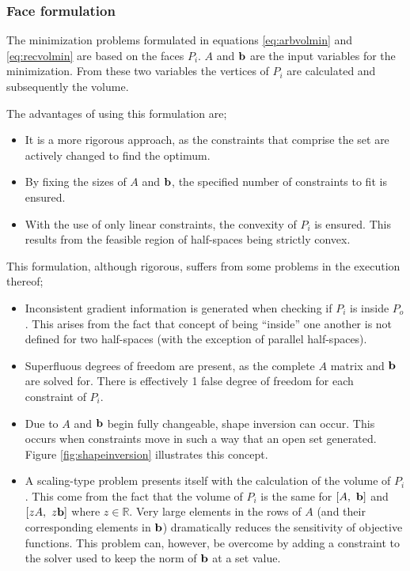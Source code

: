 \subsubsection{Face formulation}
The minimization problems formulated in equations \ref{eq:arbvolmin} and \ref{eq:recvolmin} are based on the faces $P_i$.
$A$ and ${\bf {b}}$ are the input variables for the minimization.
From these two variables the vertices of $P_i$ are calculated and subsequently the volume.

The advantages of using this formulation are;
\begin{itemize}
\item It is a more rigorous approach, as the constraints that comprise the set are actively changed to find the optimum.
\item By fixing the sizes of $A$ and ${\bf {b}}$, the specified number of constraints to fit is ensured.
\item With the use of only linear constraints, the convexity of $P_i$ is ensured.
This results from the feasible region of half-spaces being strictly convex.
\end{itemize}

This formulation, although rigorous, suffers from some problems in the execution thereof;
\begin{itemize}
\item Inconsistent gradient information is generated when checking if $P_i$ is inside $P_o$.
This arises from the fact that concept of being ``inside'' one another is not defined for two half-spaces (with the exception of parallel half-spaces).
\item Superfluous degrees of freedom are present, as the complete $A$ matrix and ${\bf {b}}$ are solved for.
There is effectively 1 false degree of freedom for each constraint of $P_i$.
\item Due to $A$ and ${\bf {b}}$ begin fully changeable, shape inversion can occur.
This occurs when constraints move in such a way that an open set generated.
Figure \ref{fig:shapeinversion} illustrates this concept.
\item A scaling-type problem presents itself with the calculation of the volume of $P_i$.
This come from the fact that the volume of $P_i$ is the same for $[A,~ {\bf {b}}]$ and $[zA,~z{\bf {b}}]$ where $z\in \mathbb{R}$.
Very large elements in the rows of $A$ (and their corresponding elements in ${\bf {b}}$) dramatically reduces the sensitivity of objective functions.
This problem can, however, be overcome by adding a constraint to the solver used to keep the norm of ${\bf {b}}$ at a set value.
\end{itemize}


